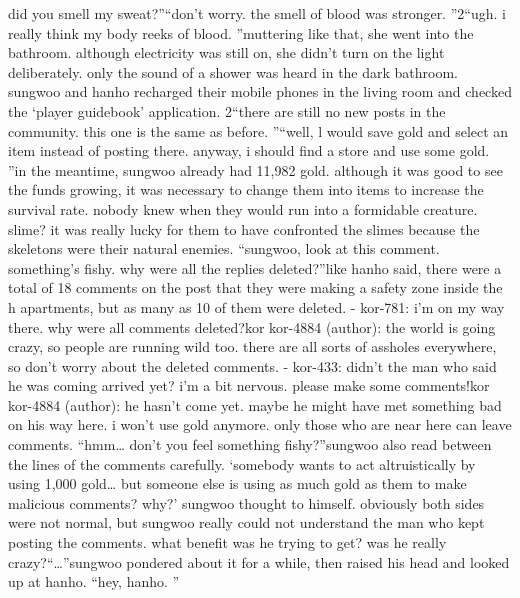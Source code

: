  did you smell my sweat?”“don’t worry.
 the smell of blood was stronger.
”2“ugh.
 i really think my body reeks of blood.
”muttering like that, she went into the bathroom.
although electricity was still on, she didn’t turn on the light deliberately.
 only the sound of a shower was heard in the dark bathroom.
 sungwoo and hanho recharged their mobile phones in the living room and checked the ‘player guidebook’ application.
2“there are still no new posts in the community.
 this one is the same as before.
”“well, l would save gold and select an item instead of posting there.
 anyway, i should find a store and use some gold.
”in the meantime, sungwoo already had 11,982 gold.
 although it was good to see the funds growing, it was necessary to change them into items to increase the survival rate.
nobody knew when they would run into a formidable creature.
slime? it was really lucky for them to have confronted the slimes because the skeletons were their natural enemies.
“sungwoo, look at this comment.
 something’s fishy.
 why were all the replies deleted?”like hanho said, there were a total of 18 comments on the post that they were making a safety zone inside the h apartments, but as many as 10 of them were deleted.
- kor-781: i’m on my way there.
 why were all comments deleted?kor kor-4884 (author): the world is going crazy, so people are running wild too.
 there are all sorts of assholes everywhere, so don’t worry about the deleted comments.
- kor-433: didn’t the man who said he was coming arrived yet? i’m a bit nervous.
 please make some comments!kor kor-4884 (author): he hasn’t come yet.
 maybe he might have met something bad on his way here.
 i won’t use gold anymore.
 only those who are near here can leave comments.
“hmm… don’t you feel something fishy?”sungwoo also read between the lines of the comments carefully.
‘somebody wants to act altruistically by using 1,000 gold… but someone else is using as much gold as them to make malicious comments? why?’ sungwoo thought to himself.
obviously both sides were not normal, but sungwoo really could not understand the man who kept posting the comments.
 what benefit was he trying to get? was he really crazy?“…”sungwoo pondered about it for a while, then raised his head and looked up at hanho.
“hey, hanho.
”

